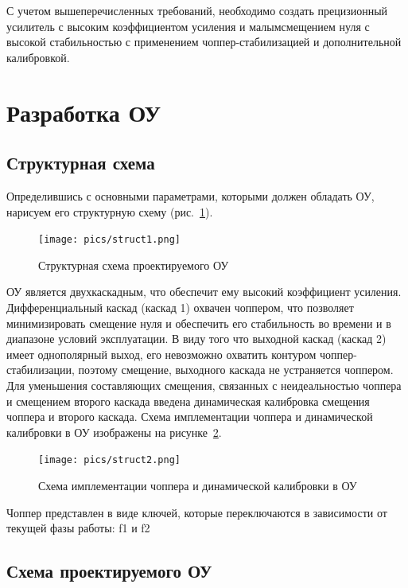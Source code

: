 \documentclass[a4paper,12pt,oneside]{scrartcl}
\begin{document}
С учетом вышеперечисленных требований,  необходимо создать прецизионный усилитель с высоким коэффициентом усиления и малымсмещением нуля с высокой стабильностью с применением  чоппер-стабилизацией и дополнительной калибровкой.

\clearpage




\section{Разработка ОУ}
\subsection{Структурная схема}

Определившись с основными параметрами, которыми должен обладать ОУ, нарисуем его структурную схему (рис.~\ref{fig:struct1}).

\begin{figure}[!htb]
\centering
\texttt{[image: pics/struct1.png]}
\caption{Структурная схема проектируемого ОУ}
\label{fig:struct1}
\end{figure}

ОУ является двухкаскадным, что обеспечит ему высокий коэффициент усиления. Дифференциальный каскад (каскад 1) охвачен чоппером, что позволяет минимизировать смещение нуля и обеспечить его стабильность во времени и в диапазоне условий эксплуатации. В виду того что выходной каскад (каскад 2) имеет однополярный выход, его невозможно охватить контуром чоппер-стабилизации, поэтому смещение, выходного каскада не устраняется чоппером. Для уменьшения составляющих смещения, связанных с неидеальностью чоппера и смещением второго каскада введена динамическая калибровка смещения чоппера и второго каскада. Схема имплементации чоппера и динамической калибровки в ОУ изображены на рисунке~\ref{fig:struct2}. 

\begin{figure}[!htb]
\centering
\texttt{[image: pics/struct2.png]}
\caption{Схема имплементации чоппера и динамической калибровки в ОУ}
\label{fig:struct2}
\end{figure}

Чоппер представлен в виде ключей, которые переключаются в зависимости от текущей фазы работы: f1 и f2





\subsection{Схема проектируемого ОУ}
\end{document}

